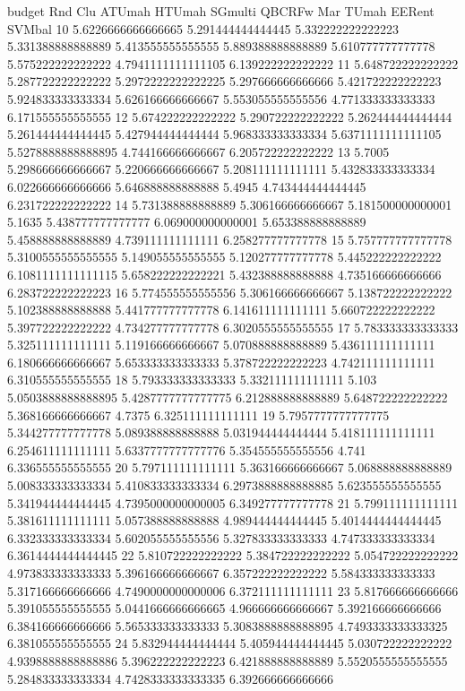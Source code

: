 budget Rnd Clu ATUmah HTUmah SGmulti QBCRFw Mar TUmah EERent SVMbal
10 5.6226666666666665 5.291444444444445 5.332222222222223 5.331388888888889 5.413555555555555 5.889388888888889 5.610777777777778 5.575222222222222 4.7941111111111105 6.139222222222222
11 5.648722222222222 5.287722222222222 5.2972222222222225 5.297666666666666 5.421722222222223 5.924833333333334 5.626166666666667 5.553055555555556 4.771333333333333 6.171555555555555
12 5.674222222222222 5.290722222222222 5.262444444444444 5.261444444444445 5.427944444444444 5.968333333333334 5.6371111111111105 5.5278888888888895 4.744166666666667 6.205722222222222
13 5.7005 5.298666666666667 5.220666666666667 5.208111111111111 5.432833333333334 6.022666666666666 5.646888888888888 5.4945 4.743444444444445 6.231722222222222
14 5.731388888888889 5.306166666666667 5.181500000000001 5.1635 5.438777777777777 6.069000000000001 5.653388888888889 5.458888888888889 4.739111111111111 6.258277777777778
15 5.757777777777778 5.3100555555555555 5.149055555555555 5.120277777777778 5.445222222222222 6.1081111111111115 5.658222222222221 5.432388888888888 4.735166666666666 6.283722222222223
16 5.774555555555556 5.306166666666667 5.138722222222222 5.102388888888888 5.441777777777778 6.141611111111111 5.660722222222222 5.397722222222222 4.734277777777778 6.3020555555555555
17 5.783333333333333 5.325111111111111 5.119166666666667 5.070888888888889 5.436111111111111 6.180666666666667 5.653333333333333 5.378722222222223 4.742111111111111 6.310555555555555
18 5.793333333333333 5.332111111111111 5.103 5.0503888888888895 5.4287777777777775 6.212888888888889 5.648722222222222 5.368166666666667 4.7375 6.325111111111111
19 5.7957777777777775 5.344277777777778 5.089388888888888 5.031944444444444 5.418111111111111 6.254611111111111 5.6337777777777776 5.354555555555556 4.741 6.336555555555555
20 5.797111111111111 5.363166666666667 5.068888888888889 5.008333333333334 5.410833333333334 6.2973888888888885 5.623555555555555 5.341944444444445 4.7395000000000005 6.349277777777778
21 5.799111111111111 5.381611111111111 5.057388888888888 4.989444444444445 5.4014444444444445 6.332333333333334 5.602055555555556 5.327833333333333 4.747333333333334 6.3614444444444445
22 5.810722222222222 5.384722222222222 5.054722222222222 4.973833333333333 5.396166666666667 6.357222222222222 5.584333333333333 5.317166666666666 4.7490000000000006 6.372111111111111
23 5.817666666666666 5.391055555555555 5.0441666666666665 4.966666666666667 5.392166666666666 6.384166666666666 5.565333333333333 5.3083888888888895 4.7493333333333325 6.381055555555555
24 5.832944444444444 5.405944444444445 5.030722222222222 4.9398888888888886 5.396222222222223 6.421888888888889 5.5520555555555555 5.284833333333334 4.7428333333333335 6.392666666666666
